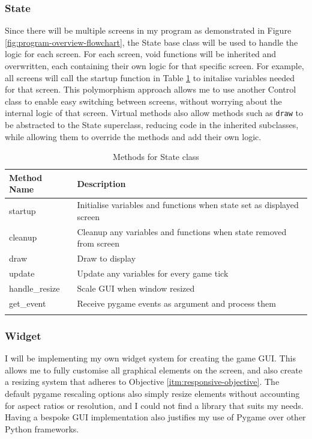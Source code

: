 \documentclass[../main/main.tex]{subfiles}
\begin{document}
\subsubsection*{State}
Since there will be multiple screens in my program as demonstrated in Figure \ref{fig:program-overview-flowchart}, the State base class will be used to handle the logic for each screen. For each screen, void functions will be inherited and overwritten, each containing their own logic for that specific screen. For example, all screens will call the startup function in Table \ref{tab:state-methods} to initalise variables needed for that screen. This polymorphism approach allows me to use another Control class to enable easy switching between screens, without worrying about the internal logic of that screen. Virtual methods also allow methods such as \lstinline[language=Python]{draw} to be abstracted to the State superclass, reducing code in the inherited subclasses, while allowing them to override the methods and add their own logic.

\begin{longtable}[c]{l|l}
    \toprule
    \textbf{Method Name} & \textbf{Description}\\
    \midrule
    \endfirsthead
    \endhead

    startup & Initialise variables and functions when state set as displayed screen\\
    cleanup & Cleanup any variables and functions when state removed from screen\\
    draw & Draw to display\\
    update & Update any variables for every game tick\\
    handle\_resize & Scale GUI when window resized\\
    get\_event & Receive pygame events as argument and process them\\

    \bottomrule
    
\caption{Methods for State class}
\label{tab:state-methods}
\end{longtable}

\subsubsection*{Widget}
I will be implementing my own widget system for creating the game GUI. This allows me to fully customise all graphical elements on the screen, and also create a resizing system that adheres to Objective \ref{itm:responsive-objective}. The default pygame rescaling options also simply resize elements without accounting for aspect ratios or resolution, and I could not find a library that suits my needs. Having a bespoke GUI implementation also justifies my use of Pygame over other Python frameworks.
\end{document}
